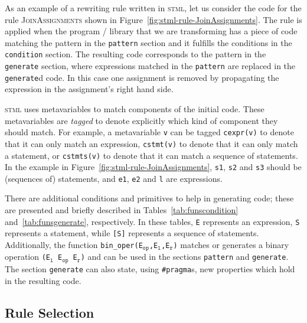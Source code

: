 \documentclass[svgnames,usenames,preprint,nocopyrightspace]{sigplanconf}
\newcommand{\stml}{\textsc{stml}\xspace}
\begin{document}
As an example of a rewriting rule written in \stml, let us consider
the code for the rule \textsc{JoinAssignments} shown in
Figure~\ref{fig:stml-rule-JoinAssignments}.  The rule is applied when
the program / library that we are transforming has a  piece of code matching the
pattern in the \texttt{pattern} section and it fulfills the conditions
in the \texttt{con\-di\-tion} section. The resulting code corresponds
to the pattern in the \texttt{generate} section, where expressions
matched in the \texttt{pattern} are replaced in the \texttt{generate}d
code.  In this case one assignment is removed by propagating the
expression in the assignment's right hand side.



\stml uses metavariables to match components of the initial code.
These metavariables are \emph{tagged} to denote explicitly which kind
of component they should match.  For example, a metavariable \texttt{v}
can be tagged \texttt{cexpr(v)} to denote that it can only match an
expression, \texttt{cstmt(v)} to denote that it can only match a
statement, or \texttt{cstmts(v)} to denote that it can match a sequence
of statements.  
In the example in Figure~\ref{fig:stml-rule-JoinAssignments},
\texttt{s1}, \texttt{s2} and \texttt{s3} should be (sequences of)
statements, and \texttt{e1}, \texttt{e2} and \texttt{l} are expressions.

There are additional conditions and primitives to help in generating
code; these 
are presented and briefly described in
Tables~\ref{tab:funscondition} and~\ref{tab:funsgenerate},
respectively.
In these tables, \texttt{E} represents an expression, \texttt{S}
represents a statement, while \texttt{[S]} represents a sequence of
statements. Additionally, the function
\texttt{bin\_oper(E$_\mathtt{op}$,E$_\mathtt{l}$,E$_\mathtt{r}$)}
matches or generates a binary operation \texttt{(E$_\mathtt{l}$
  E$_\mathtt{op}$ E$_\mathtt{r}$)} and can be used in the sections
\texttt{pattern} and \texttt{generate}.  The section \texttt{generate}
can also state, using \texttt{\#pragma}s, new properties which hold in
the resulting code.  


















\subsection{Rule Selection}
\label{sec:trans_ml_inter}
\end{document}
